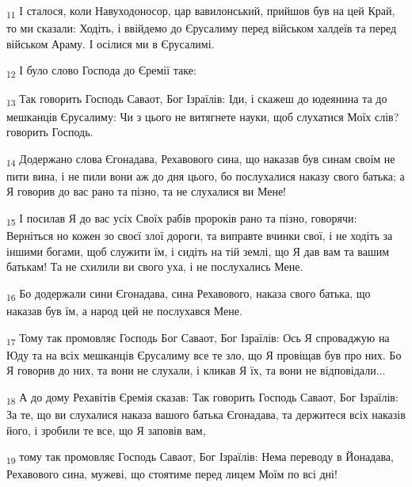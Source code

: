 \begin{tcolorbox}
\textsubscript{11} І сталося, коли Навуходоносор, цар вавилонський, прийшов був на цей Край, то ми сказали: Ходіть, і ввійдемо до Єрусалиму перед військом халдеїв та перед військом Араму. І осілися ми в Єрусалимі.
\end{tcolorbox}
\begin{tcolorbox}
\textsubscript{12} І було слово Господа до Єремії таке:
\end{tcolorbox}
\begin{tcolorbox}
\textsubscript{13} Так говорить Господь Саваот, Бог Ізраїлів: Іди, і скажеш до юдеянина та до мешканців Єрусалиму: Чи з цього не витягнете науки, щоб слухатися Моїх слів? говорить Господь.
\end{tcolorbox}
\begin{tcolorbox}
\textsubscript{14} Додержано слова Єгонадава, Рехавового сина, що наказав був синам своїм не пити вина, і не пили вони аж до дня цього, бо послухалися наказу свого батька; а Я говорив до вас рано та пізно, та не слухалися ви Мене!
\end{tcolorbox}
\begin{tcolorbox}
\textsubscript{15} І посилав Я до вас усіх Своїх рабів пророків рано та пізно, говорячи: Верніться но кожен зо своєї злої дороги, та виправте вчинки свої, і не ходіть за іншими богами, щоб служити їм, і сидіть на тій землі, що Я дав вам та вашим батькам! Та не схилили ви свого уха, і не послухались Мене.
\end{tcolorbox}
\begin{tcolorbox}
\textsubscript{16} Бо додержали сини Єгонадава, сина Рехавового, наказа свого батька, що наказав був їм, а народ цей не послухався Мене.
\end{tcolorbox}
\begin{tcolorbox}
\textsubscript{17} Тому так промовляє Господь Бог Саваот, Бог Ізраїлів: Ось Я спроваджую на Юду та на всіх мешканців Єрусалиму все те зло, що Я провіщав був про них. Бо Я говорив до них, та вони не слухали, і кликав Я їх, та вони не відповідали...
\end{tcolorbox}
\begin{tcolorbox}
\textsubscript{18} А до дому Рехавітів Єремія сказав: Так говорить Господь Саваот, Бог Ізраїлів: За те, що ви слухалися наказа вашого батька Єгонадава, та держитеся всіх наказів його, і зробили те все, що Я заповів вам,
\end{tcolorbox}
\begin{tcolorbox}
\textsubscript{19} тому так промовляє Господь Саваот, Бог Ізраїлів: Нема переводу в Йонадава, Рехавового сина, мужеві, що стоятиме перед лицем Моїм по всі дні!
\end{tcolorbox}
